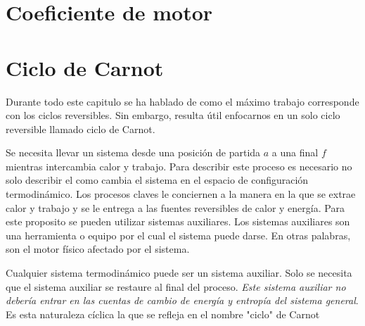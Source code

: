 \documentclass{report}
\begin{document}
\section{Coeficiente de motor}
\section{Ciclo de Carnot}
Durante todo este capitulo se ha hablado de como el máximo trabajo corresponde con los ciclos reversibles. Sin embargo, resulta útil enfocarnos en un solo ciclo reversible llamado ciclo de Carnot.

Se necesita llevar un sistema desde una posición de partida $a$ a una final $f$ mientras intercambia calor y trabajo. Para describir este proceso es necesario no solo describir el como cambia el sistema en el espacio de configuración termodinámico. Los procesos claves le conciernen a la manera en la que se extrae calor y trabajo y se le entrega a las fuentes reversibles de calor y energía. Para este proposito se pueden utilizar sistemas auxiliares. Los sistemas auxiliares son una herramienta o equipo por el cual el sistema puede darse. En otras palabras, son el motor físico afectado por el sistema.

Cualquier sistema termodinámico puede ser un sistema auxiliar. Solo se necesita que el sistema auxiliar se restaure al final del proceso. \textit{Este sistema auxiliar no debería entrar en las cuentas de cambio de energía y entropía del sistema general}. Es esta naturaleza cíclica la que se refleja en el nombre "ciclo" de Carnot
\end{document}
